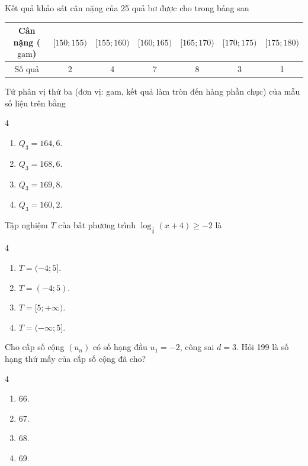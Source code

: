 \begin{baitap}
	Kết quả khảo sát cân nặng của 25 quả bơ được cho trong bảng sau
	\begin{center}
		\begin{tabular}{|c|c|c|c|c|c|c|}
			\hline
			Cân nặng ($\mathrm{gam}$) & $[150; 155)$ & $[155; 160)$ & $[160; 165)$ & $[165; 170)$ & $[170; 175)$ & $[175; 180)$ \\
			\hline
			Số quả & 2 & 4 & 7 & 8 & 3 & 1 \\
			\hline
		\end{tabular}
	\end{center}
	Tứ phân vị thứ ba (đơn vị: gam, kết quả làm tròn đến hàng phần chục) của mẫu số liệu trên bằng
	\begin{multicols}{4}
		\begin{enumerate}
			\item $Q_3 = 164{,}6$.
			\item $Q_3 = 168{,}6$.
			\item $Q_3 = 169{,}8$.
			\item $Q_3 = 160{,}2$.
		\end{enumerate}
	\end{multicols}
\end{baitap}

\begin{baitap}
	Tập nghiệm $T$ của bất phương trình $\log_{\frac{1}{3}}(x + 4) \ge -2$ là
	\begin{multicols}{4}
		\begin{enumerate}
			\item $T = (-4; 5]$.
			\item $T = (-4; 5)$.
			\item $T = [5; +\infty)$.
			\item $T = (-\infty; 5]$.
		\end{enumerate}
	\end{multicols}
\end{baitap}


\begin{baitap}
	Cho cấp số cộng $(u_n)$ có số hạng đầu $u_1 = -2$, công sai $d = 3$. Hỏi 199 là số hạng thứ mấy của cấp số cộng đã cho?
	\begin{multicols}{4}
		\begin{enumerate}
			\item 66.
			\item 67.
			\item 68.
			\item 69.
		\end{enumerate}
	\end{multicols}
\end{baitap}

